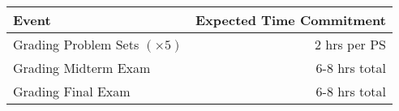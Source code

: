 \begin{table}[ht]
    \centering
    \begin{tabular}{l r}
    \textbf{Event} & \textbf{Expected Time Commitment} \\
    \toprule
    Grading Problem Sets $(\times 5)$  &  2 hrs per PS\\
    Grading Midterm Exam  &  6-8 hrs total\\
    Grading Final Exam  &  6-8 hrs total\\
    \bottomrule
    \end{tabular}
    \label{Grade-Dist}
\end{table}